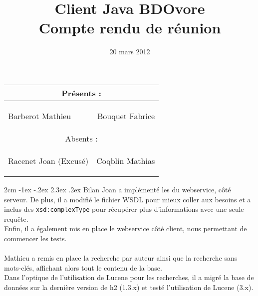 \documentclass[12pt]{article}
\title{Client Java BDOvore\\Compte rendu de réunion}
\date{20 mars 2012}
\makeatletter
\renewcommand\section{\@startsection{section}{1}{\z@}%
	{2cm \@plus -1ex \@minus -.2ex}%
	{2.3ex \@plus.2ex}%
	{\reset@font\large\bfseries}}
\newcommand{\guil}[1]{\og{#1}\fg}
\makeatother
\begin{document}
\maketitle

\begin{center}
\begin{tabular}{lr}
% 
%
  \multicolumn{2}{c}{Présents :} \\ \hline
  \begin{minipage}{0.47\linewidth}
    \vspace{0.1cm}
    \begin{flushleft}
      Barberot Mathieu
    \end{flushleft}
  \end{minipage} &
  \begin{minipage}{0.47\linewidth}
    \vspace{0.1cm}
    \begin{flushright}
      Bouquet Fabrice
    \end{flushright}
  \end{minipage} \\
  
%
%
  \multicolumn{2}{c}{Absents :} \\ \hline
  \begin{minipage}{0.47\linewidth}
    \vspace{0.1cm}
    \begin{flushleft}   
      Racenet Joan (Excusé)
    \end{flushleft}
  \end{minipage} &
  \begin{minipage}{0.47\linewidth}
    \vspace{0.1cm}	
    \begin{flushright}
      Coqblin Mathias
    \end{flushright}
  \end{minipage} \\
\end{tabular}
\end{center}


\renewcommand{\contentsname}{Ordre du jour :}
\tableofcontents


\section{Bilan}
Joan a implémenté les \guil{getters} du webservice, côté serveur. De plus, il a modifié le fichier WSDL pour mieux coller aux besoins et a inclus des \texttt{xsd:complexType} pour récupérer plus d'informations avec une seule requête.\\
Enfin, il a également mis en place le webservice côté client, nous permettant de commencer les tests.\\
\\
Mathieu a remis en place la recherche par auteur ainsi que la recherche sans mots-clés, affichant alors tout le contenu de la base.\\
Dans l'optique de l'utilisation de Lucene pour les recherches, il a migré la base de données sur la dernière version de h2 (1.3.x) et testé l'utilisation de Lucene (3.x). 
\end{document}
